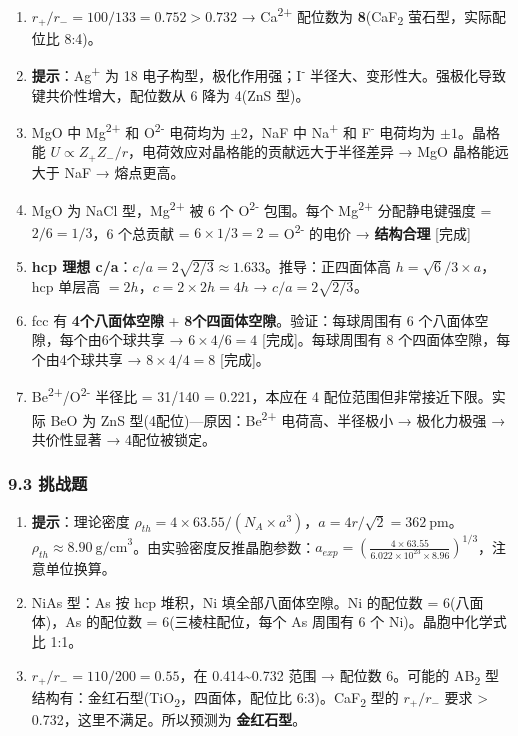 \begin{enumerate}
\def\labelenumi{\arabic{enumi}.}
\setcounter{enumi}{5}
\item
  \(r_+/r_- = 100/133 = 0.752 > 0.732\) → Ca\textsuperscript{2+} 配位数为 \textbf{8}(CaF\textsubscript{2} 萤石型，实际配位比 8:4)。
\item
  \textbf{提示}：Ag\textsuperscript{+} 为 18 电子构型，极化作用强；I\textsuperscript{-} 半径大、变形性大。强极化导致键共价性增大，配位数从 6 降为 4(ZnS 型)。
\item
  MgO 中 Mg\textsuperscript{2+} 和 O\textsuperscript{2-} 电荷均为 \(\pm2\)，NaF 中 Na\textsuperscript{+} 和 F\textsuperscript{-} 电荷均为 \(\pm1\)。晶格能 \(U \propto Z_+Z_-/r\)，电荷效应对晶格能的贡献远大于半径差异 → MgO 晶格能远大于 NaF → 熔点更高。
\item
  MgO 为 NaCl 型，Mg\textsuperscript{2+} 被 6 个 O\textsuperscript{2-} 包围。每个 Mg\textsuperscript{2+} 分配静电键强度 = \(2/6 = 1/3\)，6 个总贡献 = \(6 \times 1/3 = 2\) = O\textsuperscript{2-} 的电价 → \textbf{结构合理} {[}完成{]}
\item
  \textbf{hcp 理想 c/a}：\(c/a = 2\sqrt{2/3} \approx 1.633\)。推导：正四面体高 \(h = \sqrt{6}/3 \times a\)，hcp 单层高 \(= 2h\)，\(c = 2 \times 2h = 4h\) → \(c/a = 2\sqrt{2/3}\)。
\item
  fcc 有 \textbf{4个八面体空隙} + \textbf{8个四面体空隙}。验证：每球周围有 6 个八面体空隙，每个由6个球共享 → \(6 \times 4 / 6 = 4\) {[}完成{]}。每球周围有 8 个四面体空隙，每个由4个球共享 → \(8 \times 4 / 4 = 8\) {[}完成{]}。
\item
  Be\textsuperscript{2+}/O\textsuperscript{2-} 半径比 = 31/140 = 0.221，本应在 4 配位范围但非常接近下限。实际 BeO 为 ZnS 型(4配位)---原因：Be\textsuperscript{2+} 电荷高、半径极小 → 极化力极强 → 共价性显著 → 4配位被锁定。
\end{enumerate}

\subsubsection{9.3 挑战题}\label{ux6311ux6218ux9898-1}

\begin{enumerate}
\def\labelenumi{\arabic{enumi}.}
\setcounter{enumi}{12}
\item
  \textbf{提示}：理论密度 \(\rho_{th} = 4 \times 63.55 / (N_A \times a^3)\)，\(a = 4r/\sqrt{2} = 362\ \mathrm{pm}\)。\(\rho_{th} \approx 8.90\ \mathrm{g/cm}^3\)。由实验密度反推晶胞参数：\(a_{exp} = \left(\frac{4 \times 63.55}{6.022 \times 10^{23} \times 8.96}\right)^{1/3}\)，注意单位换算。
\item
  NiAs 型：As 按 hcp 堆积，Ni 填全部八面体空隙。Ni 的配位数 = 6(八面体)，As 的配位数 = 6(三棱柱配位，每个 As 周围有 6 个 Ni)。晶胞中化学式比 1:1。
\item
  \(r_+/r_- = 110/200 = 0.55\)，在 0.414\textasciitilde0.732 范围 → 配位数 6。可能的 AB\textsubscript{2} 型结构有：金红石型(TiO\textsubscript{2}，四面体，配位比 6:3)。CaF\textsubscript{2} 型的 \(r_+/r_-\) 要求 \textgreater{} 0.732，这里不满足。所以预测为 \textbf{金红石型}。
\end{enumerate}

